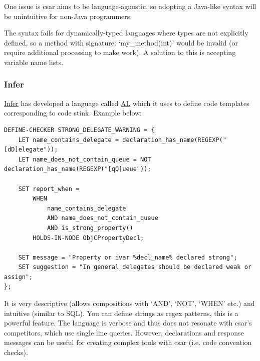 \documentclass[12pt, letterpaper]{article}
\begin{document}
One issue is csar aims to be language-agnostic, so adopting a Java-like syntax will be unintuitive for non-Java programmers.

The syntax fails for dynamically-typed languages where types are not explicitly defined, so a method with signature: `my\_method(int)' would be invalid (or require additional processing to make work).
A solution to this is accepting variable name lists.

\subsubsection{Infer}
\href{https://github.com/facebook/infer}{Infer} has developed a language called \href{https://code.facebook.com/posts/277643589367408/}{AL} which it uses to define code templates corresponding to code stink. Example below:  

\begin{lstlisting}
DEFINE-CHECKER STRONG_DELEGATE_WARNING = {
    LET name_contains_delegate = declaration_has_name(REGEXP("[dD]elegate"));
    LET name_does_not_contain_queue = NOT declaration_has_name(REGEXP("[qQ]ueue"));

    SET report_when =
        WHEN
            name_contains_delegate
            AND name_does_not_contain_queue
            AND is_strong_property()
        HOLDS-IN-NODE ObjCPropertyDecl;

    SET message = "Property or ivar %decl_name% declared strong";
    SET suggestion = "In general delegates should be declared weak or assign";
};
\end{lstlisting}

It is very descriptive (allows compositions with `AND', `NOT', `WHEN' etc.) and intuitive (similar to SQL). You can define strings as regex patterns, this is a powerful feature.
The language is verbose and thus does not resonate with csar's competitors, which use single line queries.
However, declarations and response messages can be useful for creating complex tools with csar (i.e. code convention checks).
\end{document}

